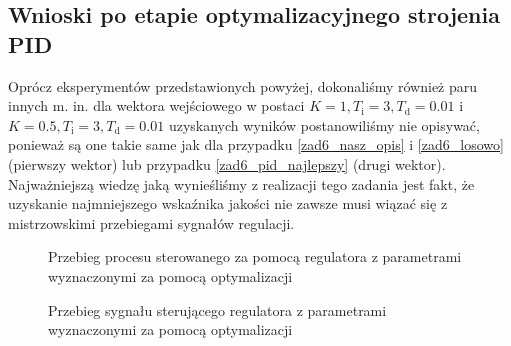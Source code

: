 \subsection{Wnioski po etapie optymalizacyjnego strojenia PID}
Oprócz eksperymentów przedstawionych powyżej, dokonaliśmy również paru innych m. in. dla wektora wejściowego w postaci $K = 1, {T_{\mathrm{i}} = 3}, {T_{\mathrm{d}} = \num{0.01}}$ i $K = \num{0.5}, {T_{\mathrm{i}} = 3}, {T_{\mathrm{d}} = \num{0.01}}$ uzyskanych wyników postanowiliśmy nie opisywać, ponieważ są one takie same jak dla przypadku \ref{zad6_nasz_opis} i \ref{zad6_losowo} (pierwszy wektor) lub przypadku \ref{zad6_pid_najlepszy} (drugi wektor). Najważniejszą wiedzę jaką wynieśliśmy z realizacji tego zadania jest fakt, że uzyskanie najmniejszego wskaźnika jakości nie zawsze musi wiązać się z mistrzowskimi przebiegami sygnałów regulacji. 
\begin{figure}[t]
    \centering
    \caption{Przebieg procesu sterowanego za pomocą regulatora z parametrami wyznaczonymi za pomocą optymalizacji}
    \label{zad6_losowo_1}
\end{figure}

\begin{figure}[b]
    \centering
    \caption{Przebieg sygnału sterującego regulatora z parametrami wyznaczonymi za pomocą optymalizacji}
    \label{zad6_losowo_sterowanie_1}
\end{figure}
\FloatBarrier

